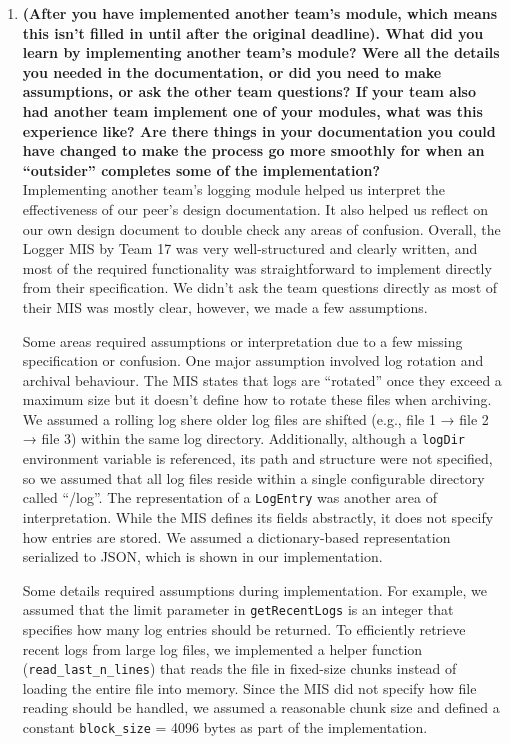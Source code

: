 \documentclass[12pt, titlepage]{article}
\begin{document}
\begin{enumerate}
  \item \textbf{(After you have implemented another team's module,
      which means this isn't filled in until after the original deadline). 
      What did you learn by implementing another team's module? Were all the details you needed in the
      documentation, or did you need to make assumptions, or ask the other team
      questions?  If your team also had another team implement one of
      your modules, what was this experience like?  Are there things in your documentation you
      could have changed to make the process go more smoothly for when an
    ``outsider'' completes some of the implementation?} \\

    Implementing another team’s logging module helped us interpret the effectiveness of our peer’s design documentation.
    It also helped us reflect on our own design document to double check any areas of confusion. Overall, the Logger MIS 
    by Team 17 was very well-structured and clearly written, and most of the required functionality was straightforward 
    to implement directly from their specification. We didn’t ask the team questions directly as most of their MIS was 
    mostly clear, however, we made a few assumptions. 

    Some areas required assumptions or interpretation due to a few missing specification or confusion. One major assumption 
    involved log rotation and archival behaviour. The MIS states that logs are “rotated” once they exceed a maximum size 
    but it doesn’t define how to rotate these files when archiving. We assumed a rolling log shere older log files are shifted 
    (e.g., file 1 → file 2 → file 3) within the same log directory. Additionally, although a \texttt{logDir} environment variable is 
    referenced, its path and structure were not specified, so we assumed that all log files reside within a single configurable 
    directory called “/log”. The representation of a \texttt{LogEntry} was another area of interpretation. While the MIS defines its 
    fields abstractly, it does not specify how entries are stored. We assumed a dictionary-based representation serialized to 
    JSON, which is shown in our implementation.

    Some details required assumptions during implementation. For example, we assumed that the limit parameter in \texttt{getRecentLogs} 
    is an integer that specifies how many log entries should be returned. To efficiently retrieve recent logs from large log files, 
    we implemented a helper function (\texttt{\texttt{read\_last\_n\_lines}}) that reads the file in fixed-size chunks instead of loading the entire 
    file into memory. Since the MIS did not specify how file reading should be handled, we assumed a reasonable chunk size 
    and defined a constant \texttt{block\_size} = 4096 bytes as part of the implementation.


\end{enumerate}
\end{document}
